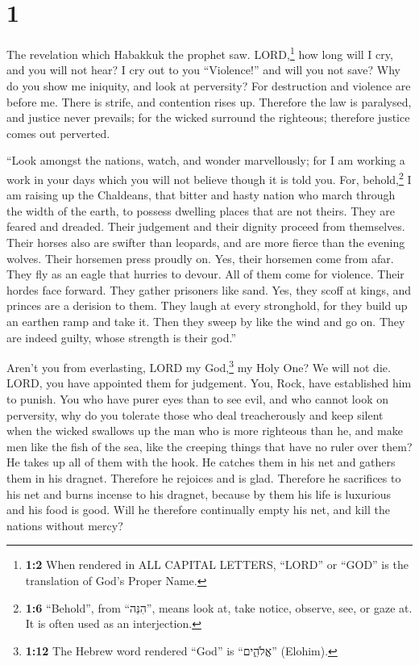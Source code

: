 \hypertarget{section}{%
\section{1}\label{section}}

 The revelation which Habakkuk the prophet saw.
 LORD,\footnote{\textbf{1:2} When rendered in ALL CAPITAL
  LETTERS, ``LORD'' or ``GOD'' is the translation of God's Proper Name.}
how long will I cry, and you will not hear? I cry out to you
``Violence!'' and will you not save?  Why do you show me
iniquity, and look at perversity? For destruction and violence are
before me. There is strife, and contention rises up. 
Therefore the law is paralysed, and justice never prevails; for the
wicked surround the righteous; therefore justice comes out perverted.

 ``Look amongst the nations, watch, and wonder
marvellously; for I am working a work in your days which you will not
believe though it is told you.  For, behold,\footnote{\textbf{1:6}
  ``Behold'', from ``הִנֵּה'', means look at, take notice, observe, see,
  or gaze at. It is often used as an interjection.} I am raising up the
Chaldeans, that bitter and hasty nation who march through the width of
the earth, to possess dwelling places that are not theirs.
 They are feared and dreaded. Their judgement and their
dignity proceed from themselves.  Their horses also are
swifter than leopards, and are more fierce than the evening wolves.
Their horsemen press proudly on. Yes, their horsemen come from afar.
They fly as an eagle that hurries to devour.  All of them
come for violence. Their hordes face forward. They gather prisoners like
sand.  Yes, they scoff at kings, and princes are a
derision to them. They laugh at every stronghold, for they build up an
earthen ramp and take it.  Then they sweep by like the
wind and go on. They are indeed guilty, whose strength is their god.''

 Aren't you from everlasting, LORD my God,\footnote{\textbf{1:12}
  The Hebrew word rendered ``God'' is ``אֱלֹהִ֑ים'' (Elohim).} my Holy
One? We will not die. LORD, you have appointed them for judgement. You,
Rock, have established him to punish.  You who have purer
eyes than to see evil, and who cannot look on perversity, why do you
tolerate those who deal treacherously and keep silent when the wicked
swallows up the man who is more righteous than he,  and
make men like the fish of the sea, like the creeping things that have no
ruler over them?  He takes up all of them with the hook.
He catches them in his net and gathers them in his dragnet. Therefore he
rejoices and is glad.  Therefore he sacrifices to his net
and burns incense to his dragnet, because by them his life is luxurious
and his food is good.  Will he therefore continually
empty his net, and kill the nations without mercy?

